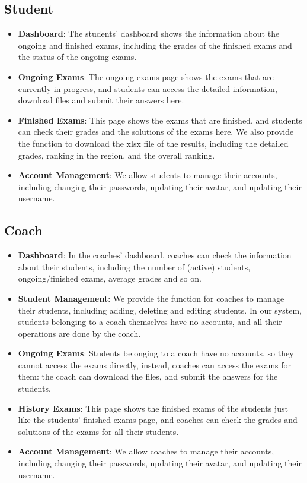 \documentclass[12pt]{article}
\begin{document}
\subsection{Student}
\begin{itemize}
    \item \textbf{Dashboard}: The students' dashboard shows the information about the ongoing and finished exams, including the grades of the finished exams and the status of the ongoing exams.
    
    \item \textbf{Ongoing Exams}: The ongoing exams page shows the exams that are currently in progress, and students can access the detailed information, download files and submit their answers here.
    
    \item \textbf{Finished Exams}: This page shows the exams that are finished, and students can check their grades and the solutions of the exams here. We also provide the function to download the xlsx file of the results, including the detailed grades, ranking in the region, and the overall ranking.
    
    \item \textbf{Account Management}: We allow students to manage their accounts, including changing their passwords, updating their avatar, and updating their username.
\end{itemize}

\subsection{Coach}
\begin{itemize}
    \item \textbf{Dashboard}: In the coaches' dashboard, coaches can check the information about their students, including the number of (active) students, ongoing/finished exams, average grades and so on.
    
    \item \textbf{Student Management}: We provide the function for coaches to manage their students, including adding, deleting and editing students. In our system, students belonging to a coach themselves have no accounts, and all their operations are done by the coach.
    
    \item \textbf{Ongoing Exams}: Students belonging to a coach have no accounts, so they cannot access the exams directly, instead, coaches can access the exams for them: the coach can download the files, and submit the answers for the students.
    
    \item \textbf{History Exams}: This page shows the finished exams of the students just like the students' finished exams page, and coaches can check the grades and solutions of the exams for all their students.
    
    \item \textbf{Account Management}: We allow coaches to manage their accounts, including changing their passwords, updating their avatar, and updating their username.
\end{itemize}
\end{document}
